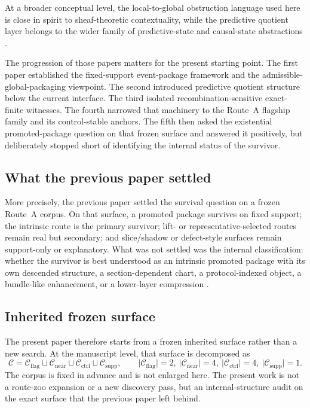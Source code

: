 \documentclass[11pt]{article}
\theoremstyle{definition}
\begin{document}
At a broader conceptual level, the local-to-global obstruction language used here is close in spirit to sheaf-theoretic contextuality, while the predictive quotient layer belongs to the wider family of predictive-state and causal-state abstractions \cite{AbramskyBrandenburger2011,ShaliziCrutchfield2001,LittmanSuttonSingh2001}.

The progression of those papers matters for the present starting point. The first paper established the fixed-support event-package framework and the admissible-global-packaging viewpoint. The second introduced predictive quotient structure below the current interface. The third isolated recombination-sensitive exact-finite witnesses. The fourth narrowed that machinery to the Route~A flagship family and its control-stable anchors. The fifth then asked the existential promoted-package question on that frozen surface and answered it positively, but deliberately stopped short of identifying the internal status of the survivor.

\subsection{What the previous paper settled}

More precisely, the previous paper settled the survival question on a frozen Route~A corpus. On that surface, a promoted package survives on fixed support; the intrinsic route is the primary survivor; lift- or representative-selected routes remain real but secondary; and slice/shadow or defect-style surfaces remain support-only or explanatory. What was not settled was the internal classification: whether the survivor is best understood as an intrinsic promoted package with its own descended structure, a section-dependent chart, a protocol-indexed object, a bundle-like enhancement, or a lower-layer compression \cite{Tsiokos2026PromotionCriteria}.

\subsection{Inherited frozen surface}

The present paper therefore starts from a frozen inherited surface rather than a new search. At the manuscript level, that surface is decomposed as
\[
\mathcal C
  = \mathcal C_{\mathrm{flag}}
    \sqcup \mathcal C_{\mathrm{near}}
    \sqcup \mathcal C_{\mathrm{ctrl}}
    \sqcup \mathcal C_{\mathrm{supp}},
\qquad
\lvert \mathcal C_{\mathrm{flag}} \rvert = 2,\ 
\lvert \mathcal C_{\mathrm{near}} \rvert = 4,\ 
\lvert \mathcal C_{\mathrm{ctrl}} \rvert = 4,\ 
\lvert \mathcal C_{\mathrm{supp}} \rvert = 1.
\]
The corpus is fixed in advance and is not enlarged here. The present work is not a route-zoo expansion or a new discovery pass, but an internal-structure audit on the exact surface that the previous paper left behind.
\end{document}
